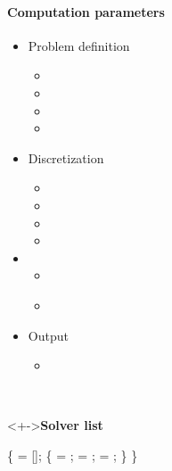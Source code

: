 \begin{frame}[fragile] 
\secframetitle{\ssParameters}
 \framesubtitle{Computation parameters}
\vspace{-0.2in}
\begin{minipage}[t]{1.80in}
\begin{itemize}
\item Problem definition
  \begin{itemize}
  \item {}
  \item {}
  \item {}
  \item {}
  \end{itemize}
\item Discretization
  \begin{itemize}
  \item {}
  \item {}
  \item {}
  \item {}
  \end{itemize}
\item {}
  \begin{itemize}
  \item {}
  \item \textcolor{red!50!black}{}
  \end{itemize}
\item Output
  \begin{itemize}
    \item {}
  \end{itemize}
\end{itemize}
\end{minipage} \
\begin{minipage}[t]{2.50in}
\vspace{-0.2in}
 \begin{block}<+->{\textbf{Solver list}}
 \footnotesize \vspace{-0.1in}
\begin{semiverbatim}
 \{
    = [];
    \{
           = ;
        = ; 
       = ;
   \}
\}
\end{semiverbatim}
\end{block}
\end{minipage}
\end{frame}

